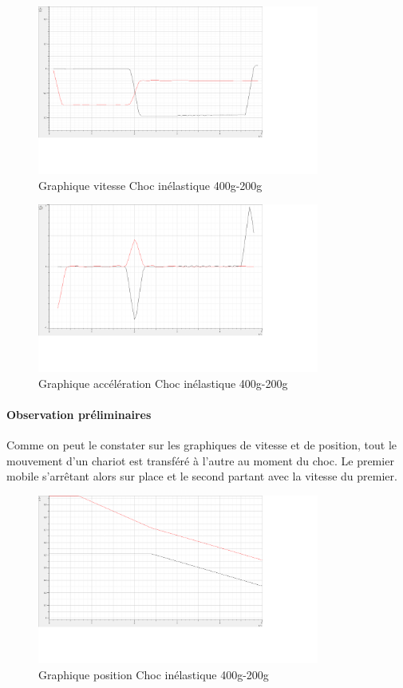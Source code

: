 \begin{figure}[h]
    \caption[Graphique vitesse Choc inélastique 400g-200g]{Graphique vitesse Choc inélastique 400g-200g}
    \centering
    \includegraphics[height=15em]{Data/400-200ela02v.png}
\end{figure}

\begin{figure}[h]
    \caption[Graphique accélération Choc inélastique 400g-200g]{Graphique accélération Choc inélastique 400g-200g}
    \centering
    \includegraphics[height=15em]{Data/400-200ela02a.png}
\end{figure}

\paragraph{Observation préliminaires}

Comme on peut le constater sur les graphiques de vitesse et de position, tout le mouvement d'un chariot est transféré à l'autre au moment du choc. Le premier mobile s'arrêtant alors sur place et le second partant avec la vitesse du premier.

\begin{figure}[h]
    \caption[Graphique position Choc inélastique 400g-200g]{Graphique position Choc inélastique 400g-200g}
    \centering
    \includegraphics[height=15em]{Data/400-200inela01.png}
\end{figure}

